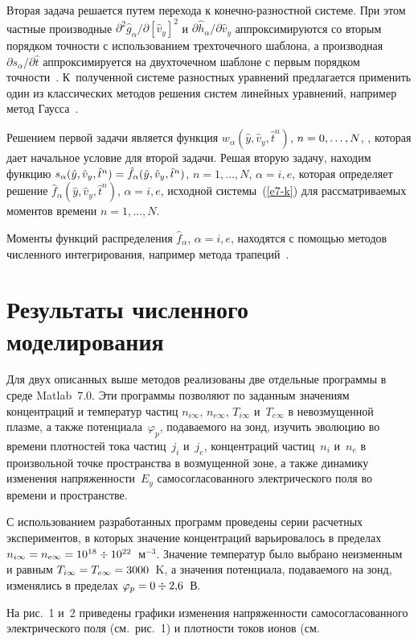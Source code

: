 \begin{multicols}{2}
Вторая задача решается путем перехода к ко\-неч\-но-раз\-ност\-ной сис\-те\-ме. При этом частные 
производные $\partial^2\hat{g}_\alpha/\partial[\hat{v}_y]^2$ и $\partial\hat{h}_\alpha/\partial\hat{v}_y$ 
аппроксимируются со вторым порядком точности с использованием трехточечного шаблона, а 
производная $\partial s_\alpha/\partial\hat{t}$ аппроксимируется на двухточечном шаблоне с первым 
порядком точности~\cite{16-k}. К~полученной системе разностных уравнений предлагается применить 
один из классических методов решения систем линейных уравнений, например метод 
Гаусса~\cite{19-k}.
      
      Решением первой задачи является функция $w_\alpha(\hat{y}, \hat{v}_y, \hat{t}^n)$, 
$n\hm=0,\ldots ,N$, , которая дает начальное условие для второй задачи. Решая вторую задачу, находим 
функцию $s_\alpha(\hat{y},\hat{v}_y,\hat{t}^n)\hm=\hat{f}_\alpha(\hat{y},\hat{v}_y,\hat{t}^n)$, 
$n=1,\ldots ,N$, $\alpha=i,e$, которая определяет решение $\hat{f}_\alpha(\hat{y},\hat{v}_y,\hat{t}^n)$, 
$\alpha=i,e$, исходной системы~(\ref{e7-k}) для рассматриваемых моментов времени $n=1,\ldots ,N$.

Моменты функций распределения $\hat{f}_\alpha$, $\alpha=i,e$, находятся с помощью методов 
численного интегрирования, например метода трапеций~\cite{19-k}.

\section{Результаты численного моделирования}

Для двух описанных выше методов реализованы две отдельные программы в среде {Matlab~7.0}. 
Эти программы позволяют по заданным значениям концентраций и температур частиц $n_{i\infty}$, 
$n_{e\infty}$, $T_{i\infty}$ и~$T_{e\infty}$ в невозмущенной плазме, а также потенциала~$\varphi_p$, 
подаваемого на зонд, изучить эволюцию во времени плотностей тока частиц~$j_i$ и~$j_e$, концентраций 
частиц~$n_i$  и~$n_e$ в произвольной точке пространства в возмущенной зоне, а также динамику 
изменения напряженности~$E_y$ самосогласованного электрического поля во времени и пространстве.

С использованием разработанных программ проведены серии расчетных экспериментов, в которых 
значение концентраций варьировалось в пределах $n_{i\infty} \hm = n_{e\infty}\hm =10^{18}\div 
10^{22}$~м$^{-3}$. Значение температур было выбрано неизменным и равным $T_{i\infty}\hm = 
T_{e\infty}\hm=3000$~K, а значения потенциала, подаваемого на зонд, изменялись в пределах 
$\varphi_p\hm=0\div 2{,}6$~В.

На рис.~1  и~2 приведены графики изменения напряженности самосогласованного электрического
 поля (см.\ рис.~1) и плотности токов ионов (см.\linebreak\vspace*{-12pt}

\pagebreak

\end{multicols}

